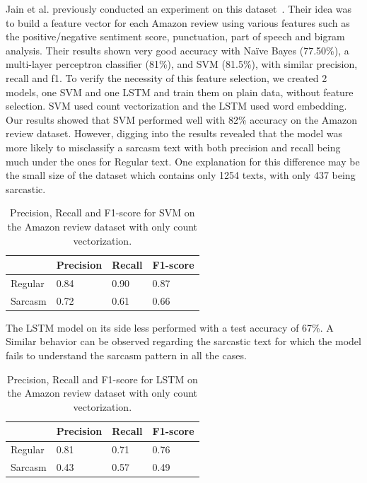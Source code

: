 \documentclass[10pt,twocolumn,letterpaper]{article}
\begin{document}
Jain et al. previously conducted an experiment on this dataset~\cite{jain2019}.
Their idea was to build a feature vector for each Amazon review using various features such as the positive/negative sentiment score, punctuation, part of speech and bigram analysis.
Their results shown very good accuracy with Naïve Bayes (77.50\%), a multi-layer perceptron classifier (81\%), and SVM (81.5\%), with similar precision, recall and f1.
To verify the necessity of this feature selection, we created 2 models, one SVM and one LSTM and train them on plain data, without feature selection.
SVM used count vectorization and the LSTM used word embedding.
Our results showed that SVM performed well with 82\% accuracy on the Amazon review dataset.
However, digging into the results revealed that the model was more likely to misclassify a sarcasm text with both precision and recall being much under the ones for Regular text.
One explanation for this difference may be the small size of the dataset which contains only 1254 texts, with only 437 being sarcastic.

\begin{table}[H]
    \centering
    \begin{tabularx}{\linewidth}{|X|X|X|X|}
        \hline
        & Precision & Recall & F1-score \\
        \hline
        Regular & 0.84 & 0.90 & 0.87 \\
        \hline
        Sarcasm & 0.72 & 0.61 & 0.66 \\
        \hline
    \end{tabularx}
    \caption{Precision, Recall and F1-score for SVM on the Amazon review dataset with only count vectorization.}
\end{table}

The LSTM model on its side less performed with a test accuracy of 67\%.
A Similar behavior can be observed regarding the sarcastic text for which the model fails to understand the sarcasm pattern in all the cases.

\begin{table}[H]
    \centering
    \begin{tabularx}{\linewidth}{|X|X|X|X|}
        \hline
        & Precision & Recall & F1-score \\
        \hline
        Regular & 0.81 & 0.71 & 0.76 \\
        \hline
        Sarcasm & 0.43 & 0.57 & 0.49 \\
        \hline
    \end{tabularx}
    \caption{Precision, Recall and F1-score for LSTM on the Amazon review dataset with only count vectorization.}
\end{table}
\end{document}
